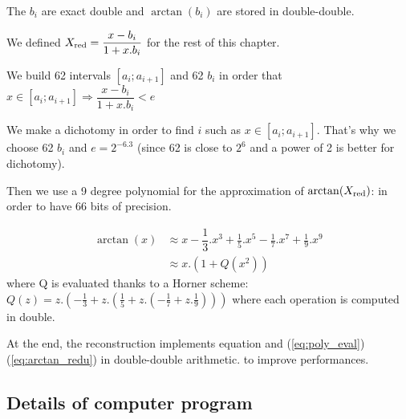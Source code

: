 The $b_i$ are exact double and $\arctan(b_i)$ are stored in
double-double.

We defined $X_{\mathrm{red}} = \dfrac{x-b_i}{1+x.b_i}$ for the rest of this chapter.

We build 62 intervals $[a_i;a_{i+1}]$ and 62 $b_i$ in order that $ x \in
[a_i;a_{i+1}] \Rightarrow \dfrac{x-b_i}{1+x.b_i} < e$

We make a dichotomy in order to find $i$ such as $ x \in [a_i;a_{i+1}]
$. That's why we choose 62 $b_i$ and $e=2^{-6.3}$ (since 62 is close to
$2^6$ and a power of 2 is better for dichotomy).

Then we use a 9 degree polynomial for the approximation of $\arctan(X_{\mathrm{red}})$:
in order to have 66 bits of precision.

\begin{equation}
\begin{split} \arctan(x)& \approx x - \dfrac{1}{3} .x^3 + \frac{1}{5}.x^5
- \frac{1}{7}.x^7 + \frac{1}{9}.x^9 \nonumber \\ \label{eq:poly_eval}
  & \approx x . ( 1 + Q(x^2))
\end{split}
\end{equation}
where 
Q is evaluated thanks to a Horner scheme:
$ Q(z) = z. (-\frac{1}{3} + z.(\frac{1}{5} + z.(-\frac{1}{7} +
z.\frac{1}{9}))) $
where each operation is computed in double.

At the end, the reconstruction implements equation and (\ref{eq:poly_eval})  
(\ref{eq:arctan_redu}) in double-double
arithmetic.
 to improve performances.



\subsection{Details of computer program}
  
